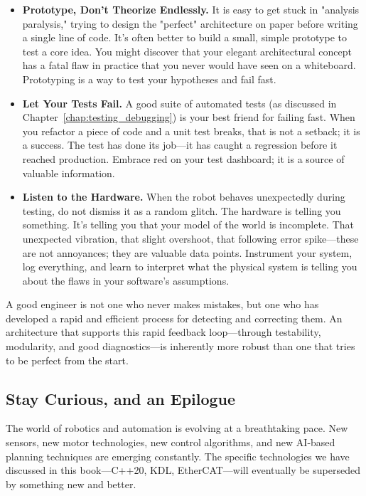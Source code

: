 \begin{itemize}
    \item \textbf{Prototype, Don't Theorize Endlessly.} It is easy to get stuck in "analysis paralysis," trying to design the "perfect" architecture on paper before writing a single line of code. It's often better to build a small, simple prototype to test a core idea. You might discover that your elegant architectural concept has a fatal flaw in practice that you never would have seen on a whiteboard. Prototyping is a way to test your hypotheses and fail fast.
    
    \item \textbf{Let Your Tests Fail.} A good suite of automated tests (as discussed in Chapter~\ref{chap:testing_debugging}) is your best friend for failing fast. When you refactor a piece of code and a unit test breaks, that is not a setback; it is a success. The test has done its job—it has caught a regression before it reached production. Embrace red on your test dashboard; it is a source of valuable information.
    
    \item \textbf{Listen to the Hardware.} When the robot behaves unexpectedly during testing, do not dismiss it as a random glitch. The hardware is telling you something. It's telling you that your model of the world is incomplete. That unexpected vibration, that slight overshoot, that following error spike—these are not annoyances; they are valuable data points. Instrument your system, log everything, and learn to interpret what the physical system is telling you about the flaws in your software's assumptions.
\end{itemize}

A good engineer is not one who never makes mistakes, but one who has developed a rapid and efficient process for detecting and correcting them. An architecture that supports this rapid feedback loop—through testability, modularity, and good diagnostics—is inherently more robust than one that tries to be perfect from the start.

\subsection{Stay Curious, and an Epilogue}
\label{subsec:stay_curious_epilogue}

The world of robotics and automation is evolving at a breathtaking pace. New sensors, new motor technologies, new control algorithms, and new AI-based planning techniques are emerging constantly. The specific technologies we have discussed in this book—C++20, KDL, EtherCAT—will eventually be superseded by something new and better.


